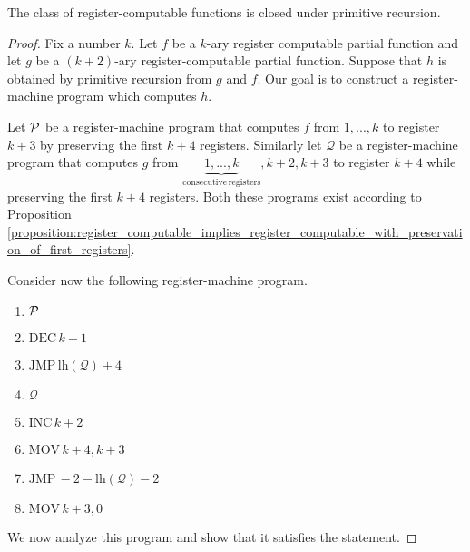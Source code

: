 \documentclass[10pt]{amsart}
\begin{document}
\begin{proposition}\label{proposition:register-computable_functions_closed_under_primitive_recursion}
	The class of register-computable functions is closed under primitive recursion.
\end{proposition}
\begin{proof}
	Fix a number $k$. Let $f$ be a $k$-ary register computable partial function and let $g$ be a $(k + 2)$-ary register-computable partial function. Suppose that $h$ is obtained by primitive recursion from $g$ and $f$. Our goal is to construct a register-machine program which computes $h$.

	Let ${\mathcal P}$ be a register-machine program that computes $f$ from $1,...,k$ to register $k + 3$ by preserving the first $k + 4$ registers. Similarly let $\mathcal{Q}$ be a register-machine program that computes $g$ from $\underbrace{1,...,k}_{\mathrm{consecutive\,registers}},k+2,k+3$ to register $k + 4$ while preserving the first $k + 4$ registers. Both these programs exist according to Proposition \ref{proposition:register_computable_implies_register_computable_with_preservation_of_first_registers}.

	Consider now the following register-machine program.
	\begin{enumerate}[label=\textbf{(\arabic*)}, leftmargin=3.0em]
		\item ${\mathcal P}$
		\item $\mathrm{DEC}\,k + 1$
		\item $\mathrm{JMP}\,\mathrm{lh}(\mathcal{Q}) + 4$
		\item $\mathcal{Q}$
		\item $\mathrm{INC}\,k + 2$
		\item $\mathrm{MOV}\,k + 4,k + 3$
		\item $\mathrm{JMP}\,-2 - \mathrm{lh}(\mathcal{Q}) - 2$
		\item $\mathrm{MOV}\,k+3,0$
	\end{enumerate}
	We now analyze this program and show that it satisfies the statement.


\end{proof}
\end{document}
